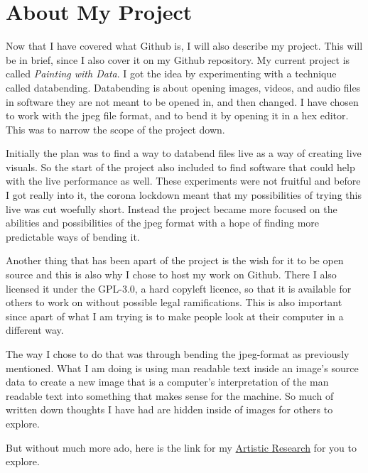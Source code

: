 \documentclass[12pt, letterpaper]{article}
\begin{document}
\section{About My Project}
Now that I have covered what Github is, I will also describe my project. This
will be in brief, since I also cover it on my Github repository. My current
project is called \textit{Painting with Data}. I got the idea by experimenting
with a technique called databending. Databending is about opening images,
videos, and audio files in software they are not meant to be opened in, and then
changed. I have chosen to work with the jpeg file format, and to bend it by
opening it in a hex editor. This was to narrow the scope of the project down.
\par
Initially the plan was to find a way to databend files live as a way of creating
live visuals. So the start of the project also included to find software that
could help with the live performance as well. These experiments were not
fruitful and before I got really into it, the corona lockdown meant that my
possibilities of trying this live was cut woefully short. Instead the project
became more focused on the abilities and possibilities of the jpeg format with a
hope of finding more predictable ways of bending it.
\par
Another thing that has been apart of the project is the wish for it to be open
source and this is also why I chose to host my work on Github. There I also
licensed it under the GPL-3.0, a hard copyleft licence, so that it is available
for others to work on without possible legal ramifications. This is also
important since apart of what I am trying is to make people look at their
computer in a different way.
\par
The way I chose to do that was through bending the jpeg-format as previously
mentioned. What I am doing is using man readable text inside an image's source
data to create a new image that is a computer's interpretation of the man
readable text into something that makes sense for the machine. So much of
written down thoughts I have had are hidden inside of images for others to
explore.
\par
\medskip
\noindent But without much more ado, here is the link for my
\href{https://github.com/aa-83/artistic_research}{Artistic Research} for you
to explore.
\end{document}
